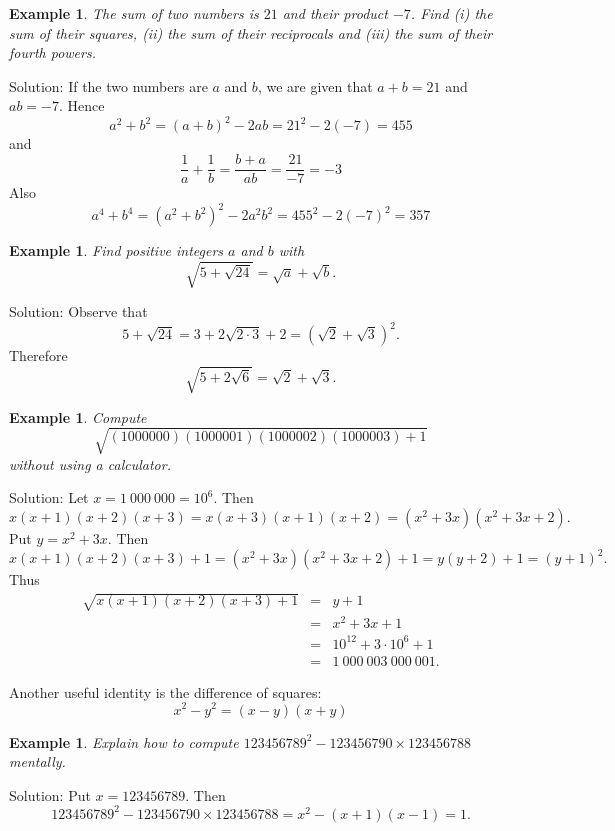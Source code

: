\documentclass[11pt, openany]{book}
\theoremstyle{change} \theoremheaderfont{\blue\sffamily\bfseries}
\newtheorem{exa}[thm]{Example}
\theoremstyle{nonumberplain} \theoremheaderfont{\sffamily\bfseries}
\newcommand{\í}{\'{\i}}
\begin{document}
\begin{exa}
The sum of two numbers is $21$ and their product $-7$. Find (i)
the sum of their squares, (ii) the sum of their reciprocals and
(iii) the sum of their fourth powers.
\end{exa}
Solution: If the two numbers are $a$ and $b$, we are given that $a
+ b = 21$ and $ab = -7.$ Hence $$a^2 + b^2 = (a + b)^2 - 2ab =
21^2 - 2(-7) = 455$$ and
$$\frac{1}{a} + \frac{1}{b} = \frac{b + a}{ab} = \frac{21}{-7} = -3$$
Also
$$a^4 + b^4 = (a^2 + b^2)^2 - 2a^2b^2 = 455^2 - 2(-7)^2 = 357$$

\begin{exa} Find positive integers $a$ and $b$ with
$$\sqrt{5 + \sqrt{24}} = \sqrt{a} + \sqrt{b}.$$\end{exa}
Solution: Observe that
$$5 + \sqrt{24} = 3 + 2\sqrt{2\cdot 3} + 2 = (\sqrt{2} + \sqrt{3})^2.$$
Therefore
$$\sqrt{5 + 2\sqrt{6}} = \sqrt{2} + \sqrt{3}.$$

\begin{exa}Compute
$$\sqrt{(1 000 000)(1 000 001)(1 000 002)(1 000 003) + 1}$$ without using a calculator.
\end{exa}
Solution: Let $x = 1\ 000\ 000 = 10^6$. Then
$$x(x + 1)(x + 2)(x + 3) = x(x + 3)(x + 1)(x + 2) = (x^2 + 3x)(x^2 + 3x + 2).$$
Put $y = x^2 + 3x.$ Then
$$x(x + 1)(x + 2)(x + 3) + 1 =  (x^2 + 3x)(x^2 + 3x + 2) + 1 = y(y + 2) + 1 = (y + 1)^2.$$
Thus
$$\begin{array}{lll}\sqrt{x(x + 1)(x + 2)(x + 3) + 1} & = &  y + 1\\ & =  & x^2 + 3x + 1 \\ & = &
10^{12} + 3\cdot 10^6 + 1  \\
& =  & 1\ 000\ 003\ 000 \ 001.
\end{array}
$$


Another useful identity is the difference of squares:
\begin{equation} x^2 - y^2 = (x - y)(x + y) \end{equation}
\begin{exa} Explain how to compute $123456789^2 - 123456790\times 123456788$ mentally.\end{exa}
Solution: Put $x = 123456789$. Then
$$123456789^2 - 123456790\times 123456788 = x^2 - (x + 1)(x - 1) = 1.$$
\end{document}
